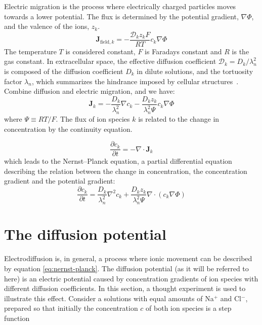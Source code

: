 \documentclass{uiophd}
\begin{document}
Electric migration is the process where electrically charged particles moves towards a lower potential. The flux is determined by the potential gradient, $\nabla \Phi$,  and the valence of the ions, $z_k$. 
\begin{equation}\label{eq:field}
\bm{J}_{\text{field},k} = -\frac{\mathcal{D}_kz_kF}{RT} c_k\nabla \Phi
\end{equation}
The temperature $T$ is considered constant, $F$ is Faradays constant and $R$ is the gas constant. In extracellular space, the effective diffusion coefficient $\mathcal{D}_k ={D}_k/\lambda_n^2$ is composed of the diffusion coefficient $D_k$ in dilute solutions, and the tortuosity factor $\lambda_n$, which summarizes the hindrance imposed by cellular structures~\cite{Halnes2015}. Combine diffusion and electric migration, and we have:
 \begin{equation}\label{eq:eldiff flux}
\bm{J}_k = -\frac{D_k}{\lambda_n^2}\nabla c_k -\frac{D_k z_k}{\lambda_n^2 \Psi}c_k  \nabla \Phi
\end{equation}
where $\Psi \equiv RT/F$.
The flux of ion species $k$ is related to the change in concentration by the continuity equation. 

\begin{equation}\label{eq:continuity}
\frac{\partial c_k}{\partial t} = -\nabla\cdot \bm{J}_k
\end{equation}
which leads to the Nernst--Planck equation, a partial differential equation describing the relation between the change in concentration, the concentration gradient and the potential gradient:
 \begin{equation}\label{eq:nernst-planck}
\frac{\partial c_k}{\partial t}  = \frac{D_k}{\lambda_n^2}\nabla^2 c_k +\frac{D_k z_k}{\lambda_n^2 \Psi}\nabla \cdot (c_k  \nabla \Phi)
\end{equation}

\section{The diffusion potential}
Electrodiffusion is, in general, a process where ionic movement can be described by equation \ref{eq:nernst-planck}. The diffusion potential (as it will be referred to here) is an electric potential caused by concentration gradients of ion species with different diffusion coefficients. In this section, a thought experiment is used to illustrate this effect.
Consider a solutions with equal amounts of Na$^+$ and Cl$^-$, prepared so that initially the concentration $c$ of both ion species is a step function 
\end{document}
